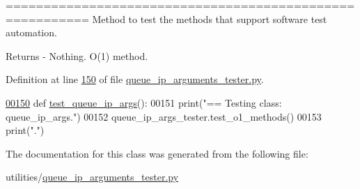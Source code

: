 ========================================================= Method to test the methods that support software test automation. 

\begin{DoxyReturn}{Returns}
-\/ Nothing. O(1) method. 
\end{DoxyReturn}


Definition at line \hyperlink{queue__ip__arguments__tester_8py_source_l00150}{150} of file \hyperlink{queue__ip__arguments__tester_8py_source}{queue\+\_\+ip\+\_\+arguments\+\_\+tester.\+py}.


\begin{DoxyCode}
\hypertarget{classutilities_1_1queue__ip__arguments__tester_1_1queue__ip__args__tester_l00150}{}\hyperlink{classutilities_1_1queue__ip__arguments__tester_1_1queue__ip__args__tester_aee90077323d94238d7f81b23e31207c3}{00150}     \textcolor{keyword}{def }\hyperlink{classutilities_1_1queue__ip__arguments__tester_1_1queue__ip__args__tester_aee90077323d94238d7f81b23e31207c3}{test\_queue\_ip\_args}():
00151         print(\textcolor{stringliteral}{"==   Testing class: queue\_ip\_args."})
00152         queue\_ip\_args\_tester.test\_o1\_methods()
00153         print(\textcolor{stringliteral}{"."})\end{DoxyCode}


The documentation for this class was generated from the following file\+:\begin{DoxyCompactItemize}
\item 
utilities/\hyperlink{queue__ip__arguments__tester_8py}{queue\+\_\+ip\+\_\+arguments\+\_\+tester.\+py}\end{DoxyCompactItemize}
